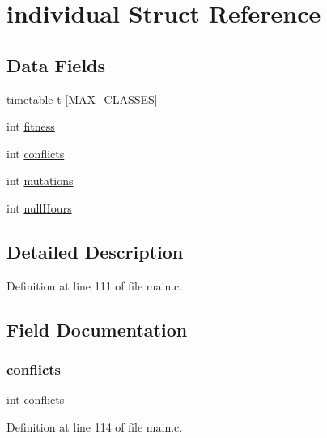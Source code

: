 \hypertarget{structindividual}{}\section{individual Struct Reference}
\label{structindividual}
\subsection*{Data Fields}
\begin{DoxyCompactItemize}
\item 
\hyperlink{structtimetable}{timetable} \hyperlink{structindividual_a80bde47459d4d03a7f1ed0c6fb5e2ffb}{t} \mbox{[}\hyperlink{main_8c_aa322a61b17e1d56852d53d5ef6a728c6}{M\+A\+X\+\_\+\+C\+L\+A\+S\+S\+ES}\mbox{]}
\item 
int \hyperlink{structindividual_ab2cb5ef123761236be21ad8440cb6e6b}{fitness}
\item 
int \hyperlink{structindividual_a1f1395e2be404ae075418f003d89342c}{conflicts}
\item 
int \hyperlink{structindividual_a935150bbe2179cbd3ea7428dd8d459c1}{mutations}
\item 
int \hyperlink{structindividual_ac45c43cafaa02d7cab79893188a9164d}{null\+Hours}
\end{DoxyCompactItemize}


\subsection{Detailed Description}


Definition at line 111 of file main.\+c.



\subsection{Field Documentation}
\hypertarget{structindividual_a1f1395e2be404ae075418f003d89342c}{}\label{structindividual_a1f1395e2be404ae075418f003d89342c} 
\subsubsection{\texorpdfstring{conflicts}{conflicts}}
{\footnotesize\ttfamily int conflicts}



Definition at line 114 of file main.\+c.

